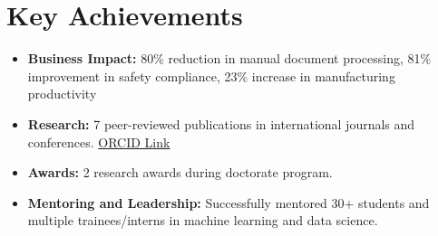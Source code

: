 \documentclass[a4paper,11pt]{article}
\begin{document}
\section{Key Achievements}
  \begin{itemize}[leftmargin=*, itemsep = -4pt]
    \item{\textbf{Business Impact: }80\% reduction in manual document processing, 81\% improvement in safety compliance, 23\% increase in manufacturing productivity}
    \item {\textbf{Research: }7 peer-reviewed publications in international journals and conferences. \href{https://orcid.org/0000-0002-2247-9046}{ORCID Link}}
    \item {\textbf{Awards: }2 research awards during doctorate program.}
    \item {\textbf{Mentoring and Leadership: }Successfully mentored 30+ students and multiple trainees/interns in machine learning and data science.}
  \end{itemize}
\end{document}
